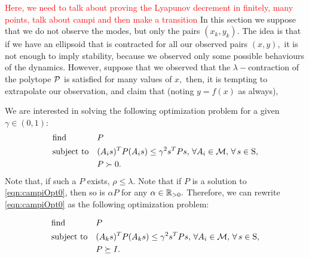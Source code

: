 \textcolor{red}{Here, we need to talk about proving the Lyapunov decrement in finitely, many points, talk about campi and then make a transition}
In this section we suppose that we do not observe the modes, but only the pairs $(x_k,y_k).$
The idea is that if we have an ellipsoid that is contracted for all our observed pairs $(x,y),$  it is not enough to imply stability, because we observed only some possible behaviours of the dynamics.  However, suppose that we observed that the $\lambda-$contraction of the polytope $\mathcal{P}$ is satisfied for many values of $x,$ then, it is tempting to extrapolate our observation, and claim that (noting $y=f(x) $ as always),

We are interested in solving the following optimization problem for a given $\gamma \in (0,1)$:
\begin{equation}
\label{eqn:campiOpt0}
\begin{aligned}
& \text{find} & & P \\
& \text{subject to} 
&  & (A_is)^TP(A_is) \leq \gamma^2 s^TPs,\,\forall A_i \in \mathcal{M}, \,\forall\, s \in \text{S},\\
& && P \succ 0. \\
\end{aligned}
\end{equation}
Note that, if such a $P$ exists, $\rho \leq \lambda$.
Note that if $P$ is a solution to \eqref{eqn:campiOpt0}, then so is $\alpha P$ for any $\alpha \in \mathbb{R}_{> 0}.$ Therefore, we can rewrite \eqref{eqn:campiOpt0} as the following optimization problem:

\begin{equation}
\label{eqn:campiOpt1}
\begin{aligned}
& \text{find} & & P \\
& \text{subject to} 
&  & (A_ks)^TP(A_ks) \leq \gamma^2 s^TPs,\, \forall A_i \in \mathcal{M}, \,\forall\, s \in \text{S},\\
& & & P \succeq I.
\end{aligned}
\end{equation}

%

